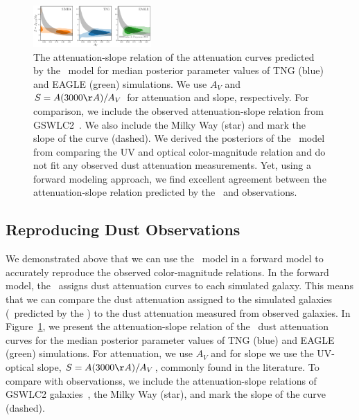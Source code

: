 \begin{figure}
\begin{center}
    \includegraphics[width=0.4\textwidth]{figs/abc_slope_AV_all.pdf}
    \caption{\label{fig:slope}
    The attenuation-slope relation of the attenuation curves predicted by the
    \eda~model for median posterior parameter values of TNG (blue) and EAGLE
    (green) simulations. We use $A_V$ and $S = A(3000\AA)/A_V$ for attenuation
    and slope, respectively. For comparison, we include the observed 
    attenuation-slope relation from GSWLC2~\citep{salim2020}. We also include 
    the Milky Way (star) and mark the slope of the \cite{calzetti2001} curve
    (dashed). We derived the posteriors of the \eda~model from comparing the
    UV and optical color-magnitude relation and do not fit any observed dust
    attenuation measurements. Yet, using a forward modeling approach, we find 
    excellent agreement between the  attenuation-slope relation predicted by
    the \eda~and observations. 
    }
\end{center}
\end{figure}

\subsection{Reproducing Dust Observations} 
We demonstrated above that we can use the \eda~model in a forward model to
accurately reproduce the observed color-magnitude relations. In the forward
model, the \eda~assigns dust attenuation curves to each simulated galaxy. This
means that we can compare the dust attenuation assigned to the simulated
galaxies (\ie~predicted by the \eda) to the dust attenuation measured from 
observed galaxies. In Figure~\ref{fig:slope}, we present the attenuation-slope 
relation of the \eda~dust attenuation curves for the median posterior parameter 
values of TNG (blue) and EAGLE (green) simulations. For attenuation, we use
$A_V$ and for slope we use the UV-optical slope, $S = A(3000\AA)/A_V$, commonly
found in the literature. To compare with observationss, we include the 
attenuation-slope relations of GSWLC2 galaxies~\citep[grey;][]{salim2020}, the
Milky Way (star), and mark the slope of the \cite{calzetti2001} curve (dashed). 


